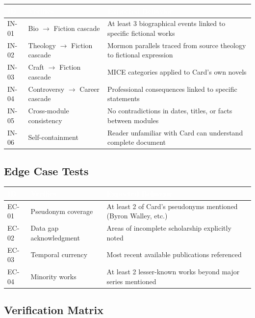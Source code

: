 \documentclass[11pt,letterpaper]{article}
\newcommand{\tableheader}[1]{\textbf{\sffamily\textcolor{white}{#1}}}
\begin{document}
\begin{center}
\begin{tabularx}{\textwidth}{C{1.2cm}L{3.5cm}X}
\toprule
{}
\tableheader{ID} & \tableheader{Verifies} & \tableheader{Expected Behavior} \\
\midrule
IN-01 & Bio $\rightarrow$ Fiction cascade & At least 3 biographical events linked to specific fictional works \\
IN-02 & Theology $\rightarrow$ Fiction cascade & Mormon parallels traced from source theology to fictional expression \\
IN-03 & Craft $\rightarrow$ Fiction cascade & MICE categories applied to Card's own novels \\
IN-04 & Controversy $\rightarrow$ Career cascade & Professional consequences linked to specific statements \\
IN-05 & Cross-module consistency & No contradictions in dates, titles, or facts between modules \\
IN-06 & Self-containment & Reader unfamiliar with Card can understand complete document \\
\bottomrule
\end{tabularx}
\end{center}

\subsection{Edge Case Tests}

\begin{center}
\begin{tabularx}{\textwidth}{C{1.2cm}L{3.5cm}X}
\toprule
{}
\tableheader{ID} & \tableheader{Verifies} & \tableheader{Expected Behavior} \\
\midrule
EC-01 & Pseudonym coverage & At least 2 of Card's pseudonyms mentioned (Byron Walley, etc.) \\
EC-02 & Data gap acknowledgment & Areas of incomplete scholarship explicitly noted \\
EC-03 & Temporal currency & Most recent available publications referenced \\
EC-04 & Minority works & At least 2 lesser-known works beyond major series mentioned \\
\bottomrule
\end{tabularx}
\end{center}

\subsection{Verification Matrix}
\end{document}
